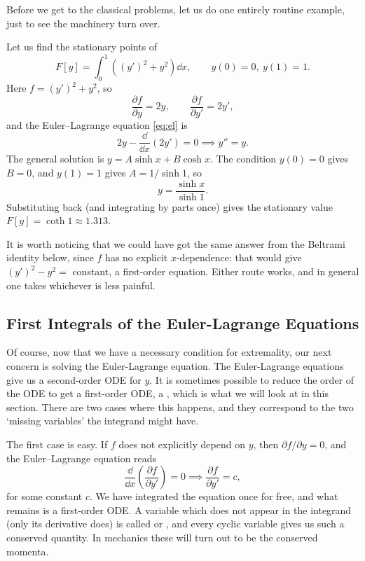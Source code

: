 \documentclass[a4paper]{scrartcl}
\begin{document}
Before we get to the classical problems, let us do one entirely routine example, just to see the machinery turn over.

\begin{example}
	Let us find the stationary points of
	$$
	F[y] = \int_0^1\left((y')^2 + y^2\right)\dd x, \qquad y(0) = 0, \ y(1) = 1.
	$$
	Here $f = (y')^2 + y^2$, so
	$$
	\frac{\partial f}{\partial y} = 2y, \qquad \frac{\partial f}{\partial y'} = 2y',
	$$
	and the Euler--Lagrange equation \eqref{eq:el} is
	$$
	2y - \frac{\dd}{\dd x}(2y') = 0 \implies y'' = y.
	$$
	The general solution is $y = A\sinh x + B\cosh x$. The condition $y(0) = 0$ gives $B = 0$, and $y(1) = 1$ gives $A = 1/\sinh 1$, so
	$$
	y = \frac{\sinh x}{\sinh 1}.
	$$
	Substituting back (and integrating by parts once) gives the stationary value $F[y] = \coth 1 \approx 1.313$.

	It is worth noticing that we could have got the same answer from the Beltrami identity below, since $f$ has no explicit $x$-dependence: that would give $(y')^2 - y^2 = $ constant, a first-order equation. Either route works, and in general one takes whichever is less painful.
\end{example}

\subsection{First Integrals of the Euler-Lagrange Equations}

Of course, now that we have a necessary condition for extremality, our next concern is solving the Euler-Lagrange equation.
The Euler-Lagrange equations give us a second-order ODE for $y$.
It is sometimes possible to reduce the order of the ODE to get a first-order ODE, a , which is what we will look at in this section.
There are two cases where this happens, and they correspond to the two `missing variables' the integrand might have.

The first case is easy. If $f$ does not explicitly depend on $y$, then $\partial f/\partial y = 0$, and the Euler--Lagrange equation reads
$$
 \frac{\dd}{\dd x} \left(\frac{\partial f}{\partial y'}\right) = 0 \implies \frac{\partial f}{\partial y'} = c,
$$
for some constant $c$. We have integrated the equation once for free, and what remains is a first-order ODE. A variable which does not appear in the integrand (only its derivative does) is called  or , and every cyclic variable gives us such a conserved quantity. In mechanics these will turn out to be the conserved momenta.
\end{document}
